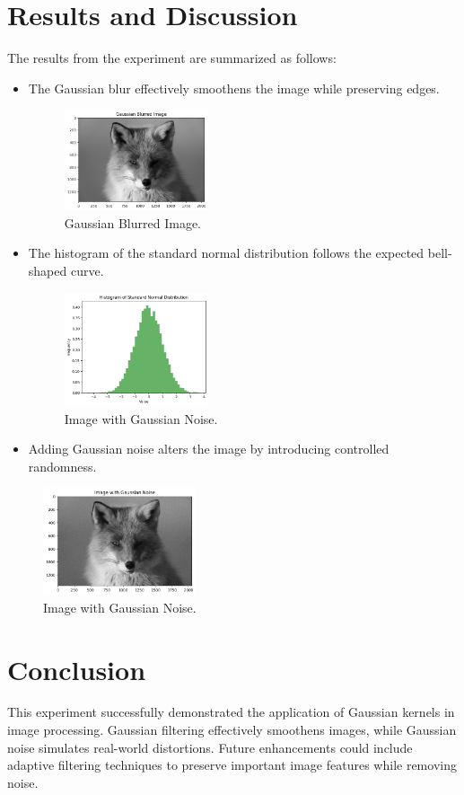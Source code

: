 \documentclass{report}
\begin{document}
\section{Results and Discussion}
The results from the experiment are summarized as follows:
\begin{itemize}
    \item The Gaussian blur effectively smoothens the image while preserving edges.
    \begin{figure}[h!]
    \centering
    \includegraphics[width=0.4\textwidth]{images/Exp-5-Results-1.png} %
    \caption{Gaussian Blurred Image.}
    \label{fig:blurred}
\end{figure}
    \item The histogram of the standard normal distribution follows the expected bell-shaped curve.
    \begin{figure}[h!]
    \centering
    \includegraphics[width=0.4\textwidth]{images/Exp-5-Results-2.png} %
    \caption{Image with Gaussian Noise.}
    \label{fig:noisy}
\end{figure}
    \item Adding Gaussian noise alters the image by introducing controlled randomness.
\end{itemize}
\begin{figure}[h!]
    \centering
    \includegraphics[width=0.4\textwidth]{images/Exp-5-Results-3.png} %
    \caption{Image with Gaussian Noise.}
    \label{fig:noisy}
\end{figure}

\section{Conclusion}
This experiment successfully demonstrated the application of Gaussian kernels in image processing. Gaussian filtering effectively smoothens images, while Gaussian noise simulates real-world distortions. Future enhancements could include adaptive filtering techniques to preserve important image features while removing noise.
\end{document}
